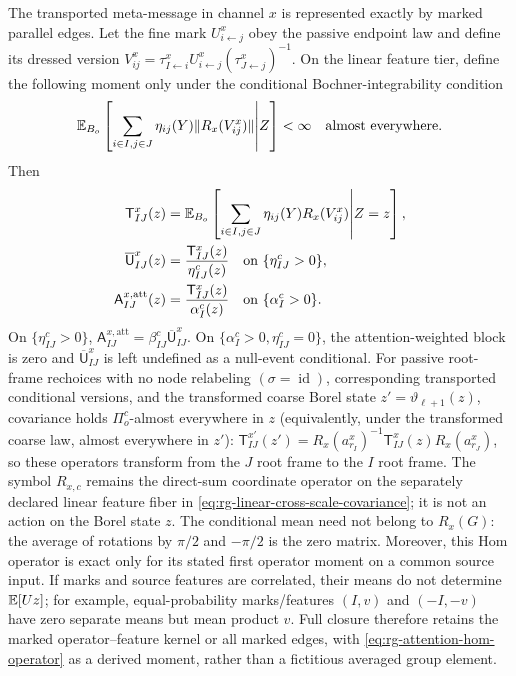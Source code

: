 The transported meta-message in channel $x$ is represented exactly by marked
parallel edges.  Let the fine mark $U^x_{i\leftarrow j}$ obey the passive
endpoint law and define its dressed version
$V_{ij}^x=\tau^x_{I\leftarrow i}U^x_{i\leftarrow j}
(\tau^x_{J\leftarrow j})^{-1}$.  On the linear feature tier, define the
following moment only under the conditional Bochner-integrability condition
\begin{equation}
\mathbb E_{B_o}\left[
\sum_{i\in I,j\in J}\eta_{ij}(Y)\|R_x(V_{ij}^x)\|
\middle|Z\right]<\infty
\quad\text{almost everywhere}.
\label{eq:rg-attention-bochner-domain}
\end{equation}
Then
\begin{equation}
\begin{split}
\mathsf T^x_{IJ}(z)
&=\mathbb E_{B_o}\left[
\sum_{i\in I,j\in J}\eta_{ij}(Y)
R_x(V_{ij}^x)\middle|Z=z\right],\\
\overline{\mathsf U}^x_{IJ}(z)
&=\frac{\mathsf T^x_{IJ}(z)}{\eta^c_{IJ}(z)}
\quad\text{on }\{\eta^c_{IJ}>0\},\\
\mathsf A^{x,\mathrm{att}}_{IJ}(z)
&=\frac{\mathsf T^x_{IJ}(z)}{\alpha_I^c(z)}
\quad\text{on }\{\alpha_I^c>0\}.
\end{split}
\label{eq:rg-attention-hom-operator}
\end{equation}
On $\{\eta^c_{IJ}>0\}$,
$\mathsf A^{x,\mathrm{att}}_{IJ}
=\beta^c_{IJ}\overline{\mathsf U}^x_{IJ}$.  On
$\{\alpha_I^c>0,\eta^c_{IJ}=0\}$, the attention-weighted block is zero and
$\overline{\mathsf U}_{IJ}^x$ is left undefined as a null-event conditional.
For passive root-frame rechoices with no node relabeling
$(\sigma=\operatorname{id})$, corresponding transported conditional versions, and the
transformed coarse Borel state $z'=\vartheta_{\ell+1}(z)$, covariance holds
$\Pi_o^c$-almost everywhere in $z$ (equivalently, under the transformed
coarse law, almost everywhere in $z'$):
$\mathsf T_{IJ}^{x\prime}(z')=R_x(a_{r_I}^x)^{-1}\mathsf T_{IJ}^x(z)
R_x(a_{r_J}^x)$, so these operators transform from the $J$ root frame to
the $I$ root frame.  The symbol $R_{x,c}$ remains the direct-sum coordinate
operator on the separately declared linear feature fiber in
\eqref{eq:rg-linear-cross-scale-covariance}; it is not an action on the Borel
state $z$.  The conditional mean need not belong to $R_x(G)$: the
average of rotations by $\pi/2$ and $-\pi/2$ is the zero matrix.  Moreover,
this Hom operator is exact only for its stated first operator moment on a
common source input.  If marks and source features are correlated, their means
do not determine $\mathbb E[Uz]$; for example, equal-probability marks/features
$(I,v)$ and $(-I,-v)$ have zero separate means but mean product $v$.  Full
closure therefore retains the marked operator--feature kernel or all marked
edges, with \eqref{eq:rg-attention-hom-operator} as a derived moment, rather
than a fictitious averaged group element.  

